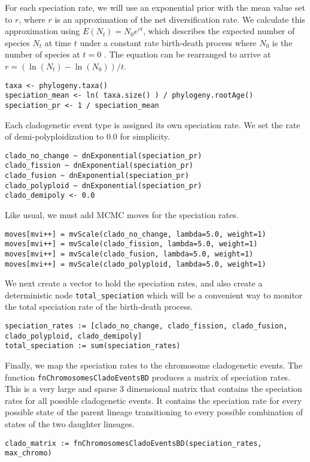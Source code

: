 For each speciation rate, we will use an exponential prior with the mean value set to $r$, where $r$ is an approximation of the net diversification rate.
We calculate this approximation using $E(N_t) = N_0 e^{rt}$,
which describes the expected number of species $N_t$ 
at time $t$ under a constant rate birth-death process
where $N_0$ is the number of species at $t=0$ \citep{nee94}. 
The equation can be rearranged to arrive at
$r = ( \ln(N_t) - \ln(N_0) ) / t$.
{\tt \begin{snugshade*}
\begin{lstlisting}
taxa <- phylogeny.taxa()
speciation_mean <- ln( taxa.size() ) / phylogeny.rootAge()
speciation_pr <- 1 / speciation_mean
\end{lstlisting}
\end{snugshade*}
}
Each cladogenetic event type is assigned its own speciation rate.
We set the rate of demi-polyploidization to 0.0 for simplicity.
{\tt \begin{snugshade*}
\begin{lstlisting}
clado_no_change ~ dnExponential(speciation_pr)
clado_fission ~ dnExponential(speciation_pr)
clado_fusion ~ dnExponential(speciation_pr)
clado_polyploid ~ dnExponential(speciation_pr)
clado_demipoly <- 0.0
\end{lstlisting}
\end{snugshade*}
}
Like usual, we must add MCMC moves for the speciation rates.
{\tt \begin{snugshade*}
\begin{lstlisting}
moves[mvi++] = mvScale(clado_no_change, lambda=5.0, weight=1)
moves[mvi++] = mvScale(clado_fission, lambda=5.0, weight=1)
moves[mvi++] = mvScale(clado_fusion, lambda=5.0, weight=1)
moves[mvi++] = mvScale(clado_polyploid, lambda=5.0, weight=1)
\end{lstlisting}
\end{snugshade*}
}
We next create a vector to hold the speciation rates,
and also create a deterministic node \texttt{total\_speciation}
which will be a convenient way to monitor the total speciation rate
of the birth-death process.
{\tt \begin{snugshade*}
\begin{lstlisting}
speciation_rates := [clado_no_change, clado_fission, clado_fusion, clado_polyploid, clado_demipoly]
total_speciation := sum(speciation_rates)
\end{lstlisting}
\end{snugshade*}
}
Finally, we map the speciation rates to the chromosome cladogenetic events.
The function \texttt{fnChromosomesCladoEventsBD}
produces a matrix of speciation rates. This is a very
large and sparse 3 dimensional matrix that contains the speciation rates 
for all possible cladogenetic events.
It contains the speciation rate for
every possible state of the parent lineage transitioning to every possible
combination of states of the two daughter lineages.
{\tt \begin{snugshade*}
\begin{lstlisting}
clado_matrix := fnChromosomesCladoEventsBD(speciation_rates, max_chromo)
\end{lstlisting}
\end{snugshade*}
}

